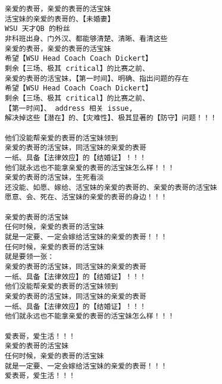 \documentclass[9pt, b5paper]{article}
\begin{document}
\begin{verbatim}
亲爱的表哥，亲爱的表哥的活宝妹 
活宝妹的亲爱的表哥的、【未婚妻】
WSU 天才QB 的粉丝
非科班出身、门外汉、都能够清楚、清晰、看清这些
亲爱的表哥，亲爱的表哥的活宝妹 
希望【WSU Head Coach Coach Dickert】
剩余【三场、极其 critical】的比赛之前、
亲爱的表哥的活宝妹，【第一时间】、明确、指出问题的存在
希望【WSU Head Coach Coach Dickert】
剩余【三场、极其 critical】的比赛之前、
【第一时间】、 address 相关 issue,
解决掉这些【潜在】的、【灾难性】、极其显著的【防守】问题！！！

他们没能帮亲爱的表哥的活宝妹领到
亲爱的表哥的活宝妹，同活宝妹的亲爱的表哥
一纸、具备【法律效应】的【结婚证】！！！
他们就永远也不能拿亲爱的表哥的活宝妹怎么样！！！
亲爱的表哥的活宝妹，生死看淡
还没能、如愿、嫁给、活宝妹的亲爱的表哥的、亲爱的表哥的活宝妹
愿意、会、死在、活宝妹的亲爱的表哥的身边！！！

亲爱的表哥的活宝妹
任何时候，亲爱的表哥的活宝妹
就是一定要、一定会嫁给活宝妹的亲爱的表哥！！！
任何时候，亲爱的表哥的活宝妹
就是要领一张：
亲爱的表哥的活宝妹，同活宝妹的亲爱的表哥
一纸、具备【法律效应】的【结婚证】！！！
他们没能帮亲爱的表哥的活宝妹领到
亲爱的表哥的活宝妹，同活宝妹的亲爱的表哥
一纸、具备【法律效应】的【结婚证】！！！
他们就永远也不能拿亲爱的表哥的活宝妹怎么样！！！

爱表哥，爱生活！！！
亲爱的表哥的活宝妹
任何时候，亲爱的表哥的活宝妹
就是一定要、一定会嫁给活宝妹的亲爱的表哥！！！
爱表哥，爱生活！！！
\end{verbatim}
\end{document}
